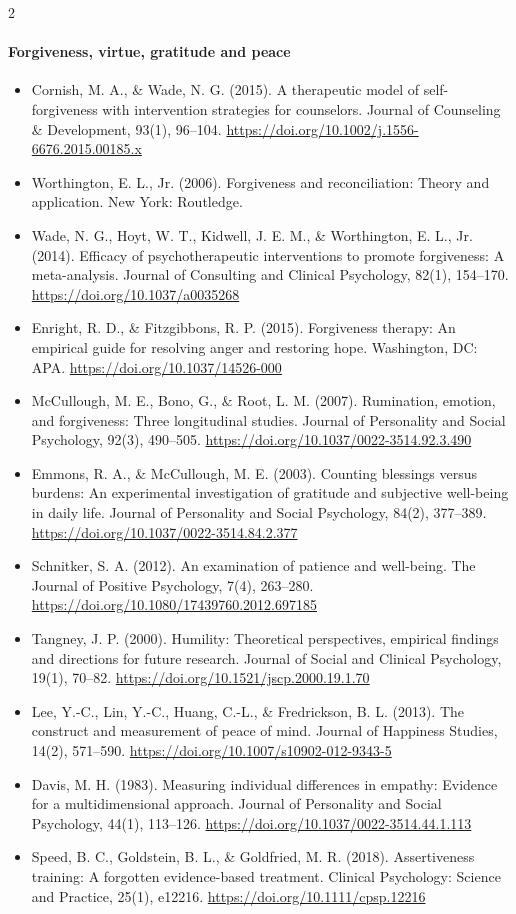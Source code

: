 \documentclass[10pt]{article}
\theoremstyle{definition}
\theoremstyle{remark}
\begin{document}
\begin{multicols}{2}
\paragraph{Forgiveness, virtue, gratitude and peace}
\begin{itemize}[leftmargin=1em,itemsep=0pt,topsep=1pt,parsep=0pt]
\item Cornish, M. A., \& Wade, N. G. (2015). A therapeutic model of self-forgiveness with intervention strategies for counselors. Journal of Counseling \& Development, 93(1), 96--104. \url{https://doi.org/10.1002/j.1556-6676.2015.00185.x}
\item Worthington, E. L., Jr. (2006). Forgiveness and reconciliation: Theory and application. New York: Routledge.
\item Wade, N. G., Hoyt, W. T., Kidwell, J. E. M., \& Worthington, E. L., Jr. (2014). Efficacy of psychotherapeutic interventions to promote forgiveness: A meta-analysis. Journal of Consulting and Clinical Psychology, 82(1), 154--170. \url{https://doi.org/10.1037/a0035268}
\item Enright, R. D., \& Fitzgibbons, R. P. (2015). Forgiveness therapy: An empirical guide for resolving anger and restoring hope. Washington, DC: APA. \url{https://doi.org/10.1037/14526-000}
\item McCullough, M. E., Bono, G., \& Root, L. M. (2007). Rumination, emotion, and forgiveness: Three longitudinal studies. Journal of Personality and Social Psychology, 92(3), 490--505. \url{https://doi.org/10.1037/0022-3514.92.3.490}
\item Emmons, R. A., \& McCullough, M. E. (2003). Counting blessings versus burdens: An experimental investigation of gratitude and subjective well-being in daily life. Journal of Personality and Social Psychology, 84(2), 377--389. \url{https://doi.org/10.1037/0022-3514.84.2.377}
\item Schnitker, S. A. (2012). An examination of patience and well-being. The Journal of Positive Psychology, 7(4), 263--280. \url{https://doi.org/10.1080/17439760.2012.697185}
\item Tangney, J. P. (2000). Humility: Theoretical perspectives, empirical findings and directions for future research. Journal of Social and Clinical Psychology, 19(1), 70--82. \url{https://doi.org/10.1521/jscp.2000.19.1.70}
\item Lee, Y.-C., Lin, Y.-C., Huang, C.-L., \& Fredrickson, B. L. (2013). The construct and measurement of peace of mind. Journal of Happiness Studies, 14(2), 571--590. \url{https://doi.org/10.1007/s10902-012-9343-5}
\item Davis, M. H. (1983). Measuring individual differences in empathy: Evidence for a multidimensional approach. Journal of Personality and Social Psychology, 44(1), 113--126. \url{https://doi.org/10.1037/0022-3514.44.1.113}
\item Speed, B. C., Goldstein, B. L., \& Goldfried, M. R. (2018). Assertiveness training: A forgotten evidence-based treatment. Clinical Psychology: Science and Practice, 25(1), e12216. \url{https://doi.org/10.1111/cpsp.12216}
\end{itemize}

\end{multicols}
\end{document}
